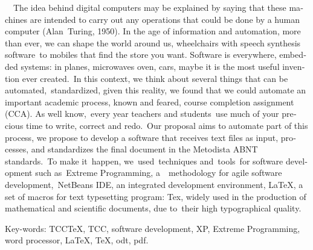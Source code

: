 \begin{resumo}[abstract]
{
\foreignlanguage{english}{\ \ The idea behind digital computers may be explained by saying that these machines are
intended to carry out any operations that could be done by a human computer (Alan\ Turing, 1950). In the age of
information and automation, more than ever, we can shape the world around us, wheelchairs with speech synthesis
software\ }\foreignlanguage{english}{to mobiles that find the store you want. Software is everywhere, embedded systems:
in planes, microwaves oven, cars, maybe it is the most useful invention ever created.\ }\foreignlanguage{english}{In
this context, we think about several things that can be automated,\ }\foreignlanguage{english}{standardized, given this
reality, we found that we could automate an important academic process, known and feared, course completion assignment
(CCA). As well know,\ }\foreignlanguage{english}{every year teachers and students\ }\foreignlanguage{english}{use much
of your precious time to write, correct and redo}\foreignlanguage{english}{.}\foreignlanguage{english}{\ Our proposal
aims to automate part of this process, we propose to develop a software that receives text files as input, processes,
and standardizes the final document in the Metodista ABNT standards.\ }\foreignlanguage{english}{To make
it\ }\foreignlanguage{english}{\textrm{happen, we\ }}\foreignlanguage{english}{\textrm{used\ techniques
and\ tools}}\foreignlanguage{english}{\ for software development such as\ Extreme Programming,
a}\foreignlanguage{english}{\textrm{\ ~methodology for agile software
development}}\foreignlanguage{english}{,}\foreignlanguage{english}{\textrm{\ }}\foreignlanguage{english}{\textrm{NetBeans
IDE, an integrated dev}}\foreignlanguage{english}{elopment environment}\foreignlanguage{english}{, {\LaTeX}, a set of
macros for text typesetting program: Tex, widely used in the production of mathematical and scientific documents, due
to\ }\foreignlanguage{english}{their high typographical quality}\foreignlanguage{english}{.}}


\bigskip

{
Key-words: TCCTeX, TCC, software development, XP, Extreme Programming, word processor, {\LaTeX}, TeX, odt, pdf.}


\bigskip

\end{resumo}